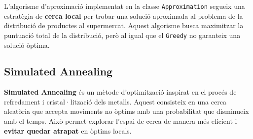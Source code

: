 \documentclass[a4paper,12pt]{report}
\begin{document}
L'algorisme d'aproximació implementat en la classe \texttt{Approximation} segueix una estratègia de \textbf{cerca local} per trobar una solució aproximada al problema de la distribució de productes al supermercat. Aquest algorisme busca maximitzar la puntuació total de la distribució, però al igual que el \texttt{Greedy} no garanteix una solució òptima.

\subsection{Simulated Annealing}
\textbf{Simulated Annealing} és un mètode d'optimització inspirat en el procés de refredament i cristal·lització dels metalls. Aquest consisteix en una cerca aleatòria que accepta moviments no òptims amb una probabilitat que disminueix amb el temps. Això permet explorar l'espai de cerca de manera més eficient i \textbf{evitar quedar atrapat} en òptims locals.
\end{document}
